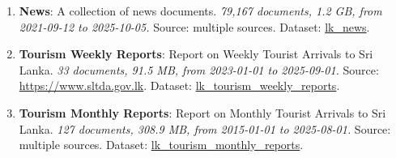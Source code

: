 \documentclass[10pt,a4paper]{article}%
\begin{document}
\begin{enumerate}
\item%
\textbf{News}: A collection of news documents.\textit{ 79,167 documents, 1.2 GB, from 2021{-}09{-}12 to 2025{-}10{-}05.} Source: multiple sources. Dataset: \href{https://github.com/nuuuwan/lk\_news/tree/data/data/lk\_news}{lk\_news}.%
\item%
\textbf{Tourism Weekly Reports}: Report on Weekly Tourist Arrivals to Sri Lanka.\textit{ 33 documents, 91.5 MB, from 2023{-}01{-}01 to 2025{-}09{-}01.} Source: \href{https://www.sltda.gov.lk}{https://www.sltda.gov.lk}. Dataset: \href{https://github.com/nuuuwan/lk\_tourism/tree/data\_lk\_tourism\_weekly\_reports/data/lk\_tourism\_weekly\_reports}{lk\_tourism\_weekly\_reports}.%
\item%
\textbf{Tourism Monthly Reports}: Report on Monthly Tourist Arrivals to Sri Lanka.\textit{ 127 documents, 308.9 MB, from 2015{-}01{-}01 to 2025{-}08{-}01.} Source: multiple sources. Dataset: \href{https://github.com/nuuuwan/lk\_tourism/tree/data\_lk\_tourism\_monthly\_reports/data/lk\_tourism\_monthly\_reports}{lk\_tourism\_monthly\_reports}.%
\end{enumerate}

%
\end{document}

